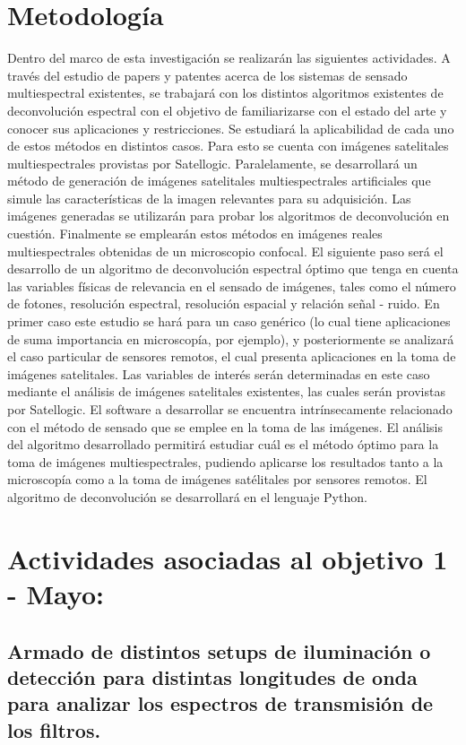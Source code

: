 \documentclass{ctuthesis}
\begin{document}
\section*{Metodología}
Dentro del marco de esta investigación se realizarán las siguientes actividades. A través del estudio de papers y patentes acerca de los sistemas de sensado multiespectral existentes, se trabajará con los distintos algoritmos existentes de deconvolución espectral con el objetivo de familiarizarse con el estado del arte y conocer sus aplicaciones y restricciones. Se estudiará la aplicabilidad de cada uno de estos métodos en distintos casos. Para esto se cuenta con imágenes satelitales multiespectrales provistas por Satellogic. 
Paralelamente, se desarrollará un método de generación de imágenes satelitales multiespectrales artificiales que simule las características de la imagen relevantes para su adquisición. Las imágenes generadas se utilizarán para probar los algoritmos de deconvolución en cuestión. Finalmente se emplearán estos métodos en imágenes reales multiespectrales obtenidas de un microscopio confocal. 
El siguiente paso será el desarrollo de un algoritmo de deconvolución espectral óptimo que tenga en cuenta las variables físicas de relevancia en el sensado de imágenes, tales como el número de fotones, resolución espectral, resolución espacial y relación señal - ruido. En primer caso este estudio se hará para un caso genérico (lo cual tiene aplicaciones de suma importancia en microscopía, por ejemplo), y posteriormente se analizará el caso particular de sensores remotos, el cual presenta aplicaciones en la toma de imágenes satelitales. Las variables de interés serán determinadas en este caso mediante el análisis de imágenes satelitales existentes, las cuales serán provistas por Satellogic.
El software a desarrollar se encuentra intrínsecamente relacionado con el método de sensado que se emplee en la toma de las imágenes. El análisis del algoritmo desarrollado permitirá estudiar cuál es el método óptimo para la toma de imágenes multiespectrales, pudiendo aplicarse los resultados tanto a la microscopía como a la toma de imágenes satélitales por sensores remotos. El algoritmo de deconvolución se desarrollará en el lenguaje Python. 

\section*{Actividades asociadas al objetivo 1 - Mayo:}
\subsection*{ Armado de distintos setups de iluminación o detección para 
distintas longitudes de onda para analizar los espectros de transmisión de los 
filtros.}
\end{document}
